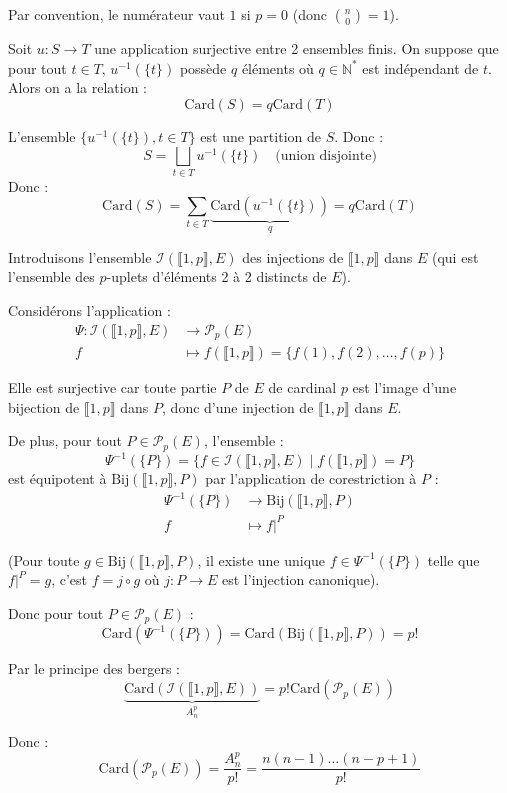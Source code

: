 \documentclass[a4paper,11pt]{article}
\newcommand{\N}{\mathbb{N}}
\begin{document}
Par convention, le numérateur vaut $1$ si $p=0$ (donc $\binom{n}{0} = 1$).

\begin{lemme}
  Soit $u : S \to T$ une application surjective entre 2 ensembles finis.
  On suppose que pour tout $t \in T$, $u^{-1}(\{t\})$ possède $q$ éléments où $q \in \N^*$ est indépendant de $t$. Alors on a la relation :
  $$ \text{Card}(S) = q \text{Card}(T) $$
\end{lemme}

\begin{demonstration}
  L'ensemble $\{u^{-1}(\{t\}), t \in T\}$ est une partition de $S$.
  Donc :
  $$ S = \bigsqcup_{t \in T} u^{-1}(\{t\}) \quad \text{(union disjointe)} $$
  Donc :
  $$ \text{Card}(S) = \sum_{t \in T} \underbrace{\text{Card}(u^{-1}(\{t\}))}_{q} = q \text{Card}(T) $$
\end{demonstration}

\begin{demonstration}
  Introduisons l'ensemble $\mathcal{I}(\llbracket 1, p \rrbracket, E)$ des injections de $\llbracket 1, p \rrbracket$ dans $E$ (qui est l'ensemble des $p$-uplets d'éléments 2 à 2 distincts de $E$).
  
  Considérons l'application :
  \begin{align*}
    \Psi : \mathcal{I}(\llbracket 1, p \rrbracket, E) &\longrightarrow \mathcal{P}_p(E) \\
    f &\longmapsto f(\llbracket 1, p \rrbracket) = \{f(1), f(2), \dots, f(p)\}
  \end{align*}
  
  Elle est surjective car toute partie $P$ de $E$ de cardinal $p$ est l'image d'une bijection de $\llbracket 1, p \rrbracket$ dans $P$, donc d'une injection de $\llbracket 1, p \rrbracket$ dans $E$.
  
  De plus, pour tout $P \in \mathcal{P}_p(E)$, l'ensemble :
  $$ \Psi^{-1}(\{P\}) = \{ f \in \mathcal{I}(\llbracket 1, p \rrbracket, E) \mid f(\llbracket 1, p \rrbracket) = P \} $$
  est équipotent à $\text{Bij}(\llbracket 1, p \rrbracket, P)$ par l'application de corestriction à $P$ :
  \begin{align*}
    \Psi^{-1}(\{P\}) &\longrightarrow \text{Bij}(\llbracket 1, p \rrbracket, P) \\
    f &\longmapsto f|^{P}
  \end{align*}
  
  (Pour toute $g \in \text{Bij}(\llbracket 1, p \rrbracket, P)$, il existe une unique $f \in \Psi^{-1}(\{P\})$ telle que $f|^{P} = g$, c'est $f = j \circ g$ où $j : P \to E$ est l'injection canonique).
  
  Donc pour tout $P \in \mathcal{P}_p(E)$ :
  $$ \text{Card}(\Psi^{-1}(\{P\})) = \text{Card}(\text{Bij}(\llbracket 1, p \rrbracket, P)) = p! $$
  
  Par le principe des bergers :
  $$ \underbrace{\text{Card}(\mathcal{I}(\llbracket 1, p \rrbracket, E))}_{A_n^p} = p! \text{Card}(\mathcal{P}_p(E)) $$
  
  Donc :
  $$ \text{Card}(\mathcal{P}_p(E)) = \frac{A_n^p}{p!} = \frac{n(n-1)\dots(n-p+1)}{p!} $$
\end{demonstration}
\end{document}
